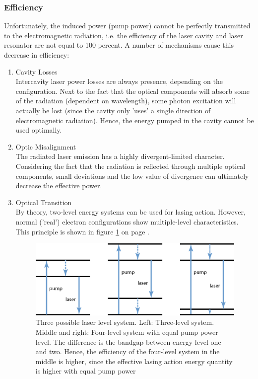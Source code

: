 	\subsubsection{Efficiency}
Unfortunately, the induced power (pump power) cannot be perfectly transmitted to the electromagnetic radiation, i.e. the efficiency of the \acs{laser} cavity and \acs{laser} resonator are not equal to 100 percent. A number of mechanisms cause this decrease in efficiency:
	\begin{enumerate}
		\item{Cavity Losses}\\
Intercavity \acs{laser} power losses are always presence, depending on the configuration. Next to the fact that the optical components will absorb some of the radiation (dependent on wavelength), some photon excitation will actually be lost (since the cavity only 'uses' a single direction of electromagnetic radiation). Hence, the energy pumped in the cavity cannot be used optimally. 
		\item{Optic Misalignment}\\
The radiated \acs{laser} emission has a highly divergent-limited character. Considering the fact that the radiation is reflected through multiple optical components, small deviations and the low value of divergence can ultimately decrease the effective power.
		\item{Optical Transition}\\
By theory, two-level energy systems can be used for lasing action. However, normal ('real') electron configurations show multiple-level characteristics. This principle is shown in figure \ref{fig:4_level_system} on page \pageref{fig:4_level_system}.

\begin{figure}[ht!]
\centering
\includegraphics[scale=0.5]{chapters/img/4_level_system.png}
\caption{Three possible laser level system. Left: Three-level system. Middle and right: Four-level system with equal pump power level. The difference is the bandgap between energy level one and two. Hence, the efficiency of the four-level system in the middle is higher, since the effective lasing action energy quantity is higher with equal pump power}
\label{fig:4_level_system}
\end{figure}
  
	\end{enumerate} 

